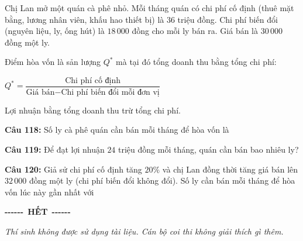\documentclass[12pt,a4paper]{article}
\begin{document}
\par\nobreak

Chị Lan mở một quán cà phê nhỏ. Mỗi tháng quán có chi phí cố định (thuê mặt bằng, lương nhân viên, khấu hao thiết bị) là $36$ triệu đồng. Chi phí biến đổi (nguyên liệu, ly, ống hút) là $18\,000$ đồng cho mỗi ly bán ra. Giá bán là $30\,000$ đồng một ly.

Điểm hòa vốn là sản lượng $Q^*$ mà tại đó tổng doanh thu bằng tổng chi phí:
\begin{center}$Q^*=\dfrac{\text{Chi phí cố định}}{\text{Giá bán}-\text{Chi phí biến đổi mỗi đơn vị}}$\end{center}
Lợi nhuận bằng tổng doanh thu trừ tổng chi phí.

\par\nobreak


\noindent \textbf{Câu 118:} Số ly cà phê quán cần bán mỗi tháng để hòa vốn là\\
\noindent{}



\vspace{0.3cm}

\noindent \textbf{Câu 119:} Để đạt lợi nhuận $24$ triệu đồng mỗi tháng, quán cần bán bao nhiêu ly?\\
\noindent{}



\vspace{0.3cm}

\noindent \textbf{Câu 120:} Giả sử chi phí cố định tăng $20\%$ và chị Lan đồng thời tăng giá bán lên $32\,000$ đồng một ly (chi phí biến đổi không đổi). Số ly cần bán mỗi tháng để hòa vốn lúc này gần nhất với\\
\noindent{}

\vspace{0.6cm}
\begin{center}
{\bfseries -{}-{}-{}-{}-{}-}\ \textbf{HẾT}\ {\bfseries -{}-{}-{}-{}-{}-}
\end{center}
\vspace{0.15cm}
{\small\itshape
Thí sinh không được sử dụng tài liệu. Cán bộ coi thi không giải thích gì thêm.}
\end{document}
